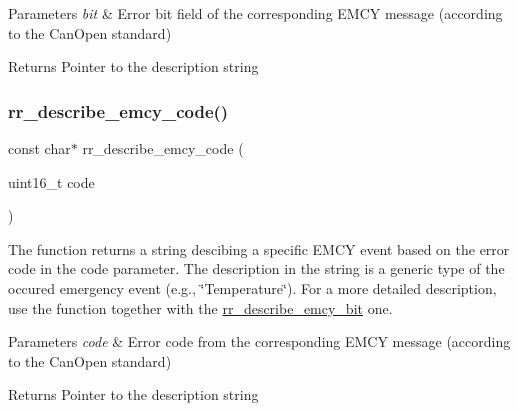 \begin{DoxyParams}{Parameters}
{\em bit} & Error bit field of the corresponding E\+M\+CY message (according to the Can\+Open standard) \\
\hline
\end{DoxyParams}
\begin{DoxyReturn}{Returns}
Pointer to the description string 
\end{DoxyReturn}
\mbox{\label{group___utils_ga2a5b7ff5f0e37ae3a856757cff7ced4f}} 
\subsubsection{\texorpdfstring{rr\+\_\+describe\+\_\+emcy\+\_\+code()}{rr\_describe\_emcy\_code()}}
{\footnotesize\ttfamily const char$\ast$ rr\+\_\+describe\+\_\+emcy\+\_\+code (\begin{DoxyParamCaption}\item[{uint16\+\_\+t}]{code }\end{DoxyParamCaption})}



The function returns a string descibing a specific E\+M\+CY event based on the error code in the \textquotesingle{}code\textquotesingle{} parameter. The description in the string is a generic type of the occured emergency event (e.\+g., \char`\"{}\+Temperature\char`\"{}). For a more detailed description, use the function together with the \hyperlink{group___utils_gaa949cec80a64afa06ed9816fe1132888}{rr\+\_\+describe\+\_\+emcy\+\_\+bit} one. 


\begin{DoxyParams}{Parameters}
{\em code} & Error code from the corresponding E\+M\+CY message (according to the Can\+Open standard) \\
\hline
\end{DoxyParams}
\begin{DoxyReturn}{Returns}
Pointer to the description string 
\end{DoxyReturn}
\mbox{\label{group___utils_ga91beec8d2ca8ea03583c21a285297861}} 
